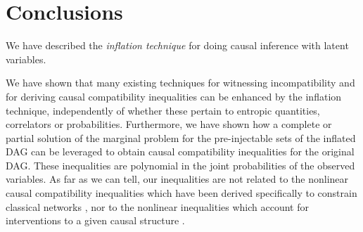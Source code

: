 \documentclass[aps,english,superscriptaddress,onecolumn,twoside,longbibliography,pra,floatfix,fleqn,nofootinbib]{revtex4-1}%
\theoremstyle{definition}
\begin{document}





\section{Conclusions}

We have described the \emph{inflation technique} for doing causal inference with latent variables.

We have shown that many existing techniques for witnessing incompatibility and for deriving causal compatibility inequalities can be enhanced by the inflation technique, independently of whether these pertain to entropic quantities, correlators or probabilities.
Furthermore, we have shown how a complete or partial solution of the marginal problem for the pre-injectable sets of the inflated DAG can be leveraged to obtain causal compatibility inequalities  for the original DAG.  These inequalities are polynomial in the joint probabilities of the observed variables.  As far as we can tell, our inequalities are not related to the nonlinear causal compatibility inequalities which have been derived specifically to constrain classical networks \cite{TavakoliStarNetworks,RossetNetworks,TavakoliNoncyclicNetworks}, nor to the nonlinear inequalities which account for interventions to a given causal structure \cite{kang2007polynomialconstraints,steeg2011relaxation}.
\end{document}
